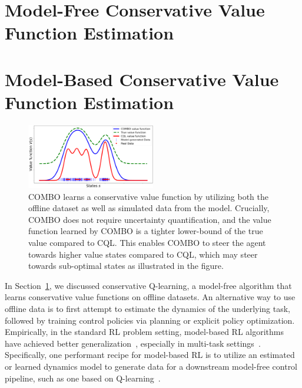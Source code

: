 \documentclass[../thesis.tex]{subfiles}
\begin{document}

\vspace{-0.2cm}
\section{Model-Free Conservative Value Function Estimation}
\label{sec:cql_section}
\vspace{-0.2cm}


% 





\vspace{-0.2cm}
\section{Model-Based Conservative Value Function Estimation}
\label{sec:combo_section}
\vspace{-0.2cm}

\begin{figure}[t!]
    \centering
    \includegraphics[width=0.5\textwidth]{chapters/combo/teaser_combo.png}
    \vspace*{-0.5cm}
    \caption{\footnotesize{COMBO learns a conservative value function by utilizing both the offline dataset as well as simulated data from the model. Crucially, COMBO does not require uncertainty quantification, and the value function learned by COMBO is a tighter lower-bound of the true value compared to CQL. This enables COMBO to steer the agent towards higher value states compared to CQL, which may steer towards sub-optimal states as illustrated in the figure.}}
    \vspace*{-0.6cm}
    \label{fig:combo_teaser}
\end{figure}

In Section~\ref{sec:cql_section}, we discussed conservative Q-learning, a model-free algorithm that learns conservative value functions on offline datasets. An alternative way to use offline data is to first attempt to estimate the dynamics of the underlying task, followed by training control policies via planning or explicit policy optimization. Empirically, in the standard RL problem setting, model-based RL algorithms have achieved better generalization~\citep{sutton1991dyna,janner2019mbpo}, especially in multi-task settings~\citep{yu2020mopo}. Specifically, one performant recipe for model-based RL is to utilize an estimated or learned dynamics model to generate data for a downstream model-free control pipeline, such as one based on Q-learning~\citep{janner2019mbpo}. 
\end{document}
